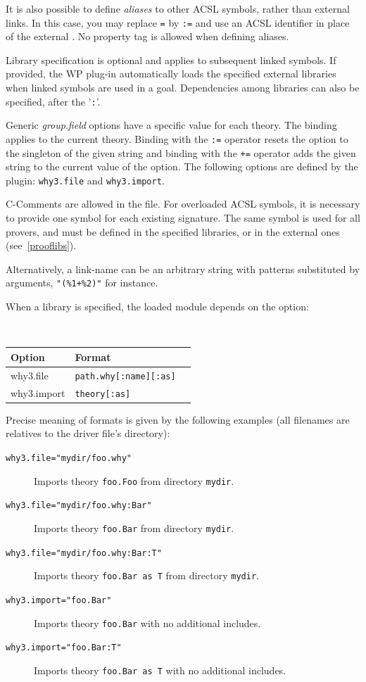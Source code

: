 It is also possible to define \emph{aliases} to other ACSL symbols, rather
than external links. In this case, you may replace \verb+=+ by
\verb+:=+ and use an ACSL identifier in place of the external .
No property tag is allowed when defining aliases.

Library specification is optional and applies to subsequent linked
symbols. If provided, the \textsf{WP} plug-in automatically loads the
specified external libraries when linked symbols are used in a
goal. Dependencies among libraries can also be specified, after the
'\verb':''.

Generic \textit{group}.\textit{field} options have a specific
value for each theory. The binding applies to the current theory.
Binding with the \verb':=' operator
resets the option to the singleton of the given string
and binding with the \verb'+=' operator
adds the given string to the current value of the option.
The following options are defined by the plugin:
\texttt{why3.file} and \texttt{why3.import}.

\textsf{C}-Comments are allowed in the file. For overloaded
\textsf{ACSL} symbols, it is necessary to provide one  symbol for
each existing signature. The same  symbol is used for all provers,
and must be defined in the specified libraries, or in the external
ones (see~\ref{prooflibs}).

Alternatively, a link-name can be an arbitrary string
with patterns substituted by arguments, \verb="(%1+%2)"= for instance.

When a library  is specified, the loaded module depends on the
option:
\begin{center}\tt
  \begin{tabular}{lll}
    \textrm{Option} & \textrm{Format} \\
    \hline
    why3.file & \verb+path.why[:name][:as]+ \\
    why3.import & \verb+theory[:as]+ \\
  \end{tabular}
\end{center}

Precise meaning of formats is given by the following examples (all filenames are relatives to the driver file's directory):
\begin{description}
\item[\tt why3.file="mydir/foo.why"] Imports theory \verb+foo.Foo+ from directory \verb+mydir+.
\item[\tt why3.file="mydir/foo.why:Bar"] Imports theory \verb+foo.Bar+ from directory \verb+mydir+.
\item[\tt why3.file="mydir/foo.why:Bar:T"] Imports theory \verb+foo.Bar as T+ from directory \verb+mydir+.
\item[\tt why3.import="foo.Bar"] Imports theory \verb+foo.Bar+ with no additional includes.
\item[\tt why3.import="foo.Bar:T"] Imports theory \verb+foo.Bar as T+ with no additional includes.
\end{description}

